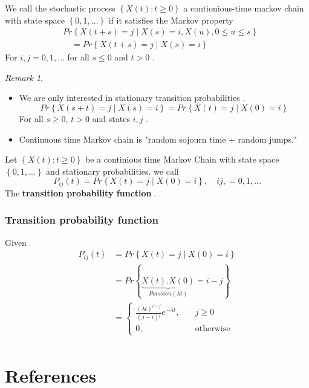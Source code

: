 \documentclass{article}
\theoremstyle{remark}
\newtheorem*{remark}{Remark}
\begin{document}
We call the stochastic process $\left\{ X\left( t \right): t\ge 0 \right\}$ a contionious-time markov chain with state space $\left\{ 0,1, \ldots \right\}$ if it satisfies the Markov property \[
  \begin{split}
&Pr \left \{   X\left( t+s \right) = j  \mid  X\left( s \right) = i, X\left( u \right),   0\le u \le s \right \}   \\
 & \quad   = Pr \left \{   X\left( t+s \right) = j  \mid  X\left( s \right) = i\right \} 
  \end{split} 
\] 
For $i,j = 0,1,\ldots$ for all $s \le 0$ and $t > 0$ .

\newpage
\begin{remark}
  \begin{itemize}
    \item We are only interested in stationary transition probabilities . \[
    Pr \left \{  X\left( s + t \right) = j  \mid  X\left( s \right) = i \right \}  = Pr \left \{ X\left( t \right) = j  \mid  X\left( 0 \right) = i  \right \} 
    \] 
    For all $ s \ge 0$, $t> 0$ and states $i,j$ .  
  \item Continuous time Markov chain is "random sojourn time + random jumps."
  \end{itemize}
\end{remark}


\begin{definition}
  Let $\left\{ X\left( t \right) : t\ge 0 \right\}$ be a continious time Markov Chain with state space $\left\{ 0,1, \ldots \right\}$ and stationary probabilities. we call \[
  P_{ij} \left( t \right) = Pr \left \{ X\left( t \right) = j  \mid  X\left( 0 \right) = i  \right \}  , \quad  ij, = 0,1, \ldots 
  \] 
  The \textbf{transition probability function} .
\end{definition}


\subsubsection{Transition probability function}%
\label{ssub:transition_probability_function}

Given \[
  \begin{split}
P_{ij}\left( t \right)  & = Pr \left \{  X\left( t \right) = j  \mid  X\left( 0 \right) = i \right \}  \\
 &=  Pr \left \{  \underbrace{X\left( t \right) . X\left( 0 \right)}_{Poission\left( \lambda t \right)}  = i - j \right \}  \\
 &=  \begin{cases}
    \frac{\left( \lambda t \right)^{i-j}}{\left( j-i \right)!}  e^{-\lambda t}, &  
     \quad j \ge 0 \\
    0 , &  \quad \text{otherwise} 
 \end{cases} \\
  \end{split} 
\] 


\section{References}
\label{sec:references}




\end{document}
